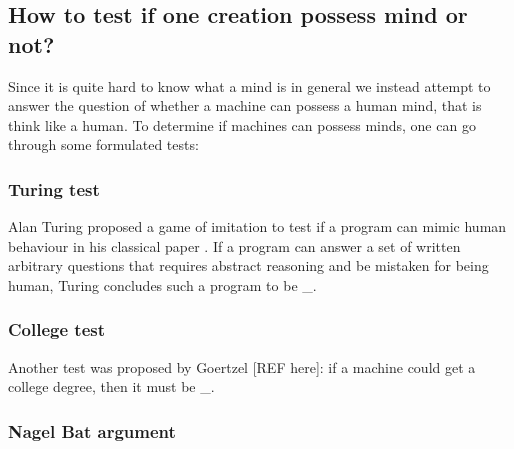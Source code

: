 \documentclass[11pt]{article}
\newenvironment{sketch}{\color{dark-green-2}}{\ignorespacesafterend}
\begin{document}
\subsection{How to test if one creation possess mind or not?}

\begin{sketch}
Since it is quite hard to know what a mind is in general we instead attempt to answer the question of whether a machine can possess a human mind, that is think like a human. To determine if machines can possess minds, one can go through some formulated tests:

\subsubsection*{Turing test}

Alan Turing proposed a game of imitation to test if a program can mimic human behaviour in his classical paper \cite{turing1950computing}. If a program can answer a set of written arbitrary questions that requires abstract reasoning and be mistaken for being human, Turing concludes such a program to be \_.

\subsubsection*{College test}

Another test was proposed by Goertzel [REF here]: if a machine could get a college degree, then it must be \_. 
\end{sketch}

\subsubsection*{Nagel Bat argument}
\end{document}
